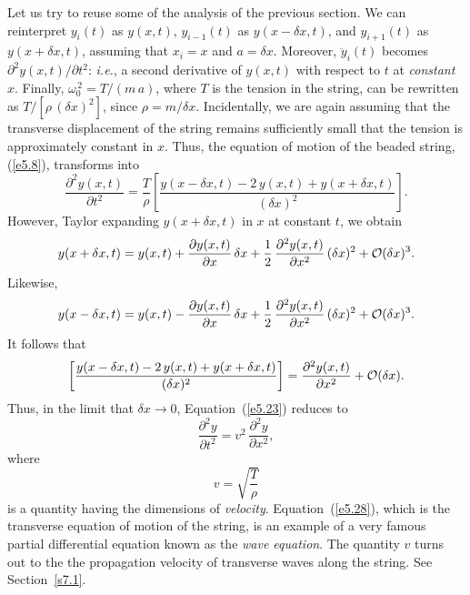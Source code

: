 Let us try to reuse some of the analysis of the previous section. We can reinterpret
$y_i(t)$ as $y(x,t)$, $y_{i-1}(t)$ as $y(x-\delta x,t)$, and $y_{i+1}(t)$ as
$y(x+\delta x,t)$, assuming that $x_i=x$ and $a=\delta x$. Moreover, $\ddot{y}_i(t)$
becomes $\partial^2 y(x,t)/\partial t^2$: {\em i.e.}, a second derivative of
$y(x,t)$ with respect to $t$ at {\em constant}\/ $x$. Finally, $\omega_0^{\,2}= T/(m\,a)$, where
$T$ is the tension in the string, can be rewritten as $T/[\rho\,(\delta x)^2]$, since $\rho=m/\delta x$. Incidentally, we are again assuming that the transverse displacement of the
string remains sufficiently small that the tension is approximately constant in $x$. 
Thus,  the equation of motion of the beaded string, (\ref{e5.8}),  transforms into
\begin{equation}\label{e5.23}
\frac{\partial^2 y(x,t)}{\partial t^2} = \frac{T}{\rho}\left[\frac{y(x-\delta x,t)-2\,y(x,t)+y(x+\delta x,t)}{(\delta x)^2}\right].
\end{equation}
However, Taylor expanding $y(x+\delta x,t)$ in $x$ at constant $t$, we obtain
\begin{equation}
y(x+\delta x,t) = y(x,t) + \frac{\partial y(x,t)}{\partial x}\,\delta x + \frac{1}{2}\,\frac{\partial^2 y(x,t)}{\partial x^2}\,(\delta x)^2 + {\cal O}(\delta x)^3.
\end{equation}
Likewise,
 \begin{equation}
y(x-\delta x,t) = y(x,t) - \frac{\partial y(x,t)}{\partial x}\,\delta x + \frac{1}{2}\,\frac{\partial^2 y(x,t)}{\partial x^2}\,(\delta x)^2 + {\cal O}(\delta x)^3.
\end{equation}
It follows that
\begin{equation}
\left[\frac{y(x-\delta x,t)-2\,y(x,t)+y(x+\delta x,t)}{(\delta x)^2}\right]
=\frac{\partial^2 y(x,t)}{\partial x^2} + {\cal O}(\delta x).
\end{equation}
Thus, in the limit that $\delta x\rightarrow 0$, Equation~(\ref{e5.23}) reduces
to
\begin{equation}\label{e5.28}
\frac{\partial^2 y}{\partial t^2} = v^2\,\frac{\partial^2 y}{\partial x^2},
\end{equation}
where
\begin{equation}
v = \sqrt{\frac{T}{\rho}}
\end{equation}
is a quantity having the dimensions of {\em velocity}. Equation~(\ref{e5.28}), which is
the transverse equation of motion of the string, is an example of a very famous partial differential
equation known as the
{\em wave equation}. The quantity $v$ turns out to the the propagation
velocity of transverse waves along the string. See Section~\ref{s7.1}.

